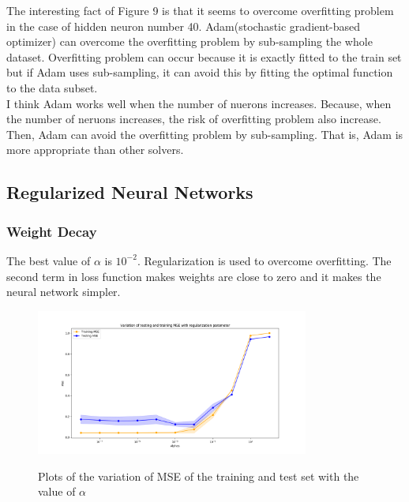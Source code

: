 \documentclass[a4paper]{article}
\begin{document}
The interesting fact of Figure 9 is that it seems to overcome overfitting problem in the case of hidden neuron number 40. Adam(stochastic gradient-based optimizer) can overcome the overfitting problem by sub-sampling the whole dataset. Overfitting problem can occur because it is exactly fitted to the train set but if Adam uses sub-sampling, it can avoid this by fitting the optimal function to the data subset.\\
I think Adam works well when the number of nuerons increases. Because, when the number of neruons increases, the risk of overfitting problem also increase. Then, Adam can avoid the overfitting problem by sub-sampling. That is, Adam is more appropriate than other solvers.
\subsection{Regularized Neural Networks}
\subsubsection{Weight Decay}
The best value of $\alpha$ is $10^{-2}$. Regularization is used to overcome
overfitting. The second term in loss function makes weights are close to
zero and it makes the neural network simpler.
\begin{figure}[h]
  \begin{center}
  \includegraphics[width=0.8\textwidth]{ex_1_2_a.png}\\
  \caption{Plots of the variation of MSE of the training and test set with the value of $\alpha$}
  \end{center}
\end{figure}
\clearpage
\end{document}
